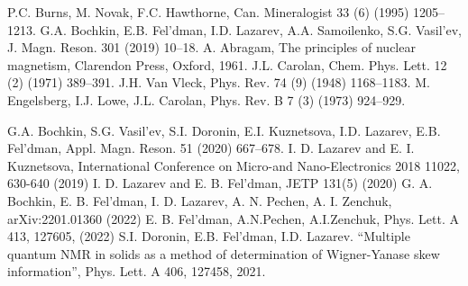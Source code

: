 \begin{thebibliography}{}
 P.C. Burns, M. Novak, F.C. Hawthorne, Can. Mineralogist 33 (6) (1995) 1205– 1213.
 G.A. Bochkin, E.B. Fel’dman, I.D. Lazarev, A.A. Samoilenko, S.G. Vasil’ev, J. Magn. Reson. 301 (2019) 10–18.
 A. Abragam, The principles of nuclear magnetism, Clarendon Press, Oxford, 1961.
 J.L. Carolan, Chem. Phys. Lett. 12 (2) (1971) 389–391.
 J.H. Van Vleck, Phys. Rev. 74 (9) (1948) 1168–1183.
 M. Engelsberg, I.J. Lowe, J.L. Carolan, Phys. Rev. B 7 (3) (1973) 924–929.





 G.A. Bochkin, S.G. Vasil’ev, S.I. Doronin, E.I. Kuznetsova, I.D. Lazarev, E.B. Fel’dman, Appl. Magn. Reson. 51 (2020) 667–678.
 I. D. Lazarev and  E. I. Kuznetsova, International Conference on Micro-and Nano-Electronics 2018 11022, 630-640 (2019)
 I. D. Lazarev and E. B. Fel'dman, JETP 131(5) (2020)
 G. A. Bochkin, E. B. Fel'dman, I. D. Lazarev, A. N. Pechen, A. I. Zenchuk,  arXiv:2201.01360 (2022)
 E. B. Fel'dman, A.N.Pechen, A.I.Zenchuk, Phys. Lett. A 413, 127605, (2022)
 S.I. Doronin, E.B. Fel’dman, I.D. Lazarev. “Multiple quantum NMR in solids as a method of determination of Wigner-Yanase skew information”, Phys. Lett. A 406, 127458, 2021.

\end{thebibliography}
